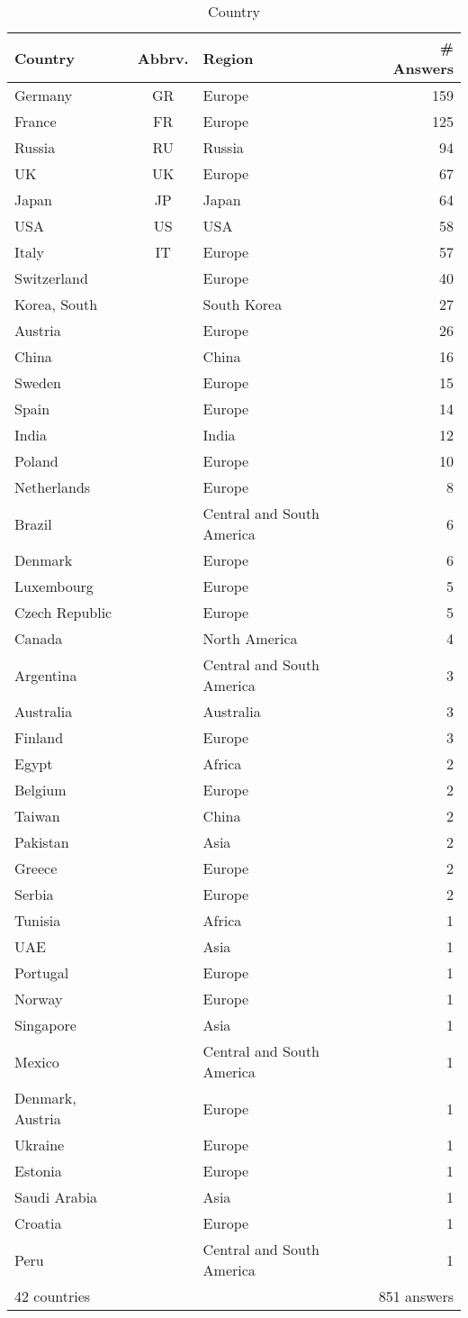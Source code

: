 \begin{table}[htb]%
\begin{center}%
\caption{Country}\label{tab:countries}%
\begin{tabular}{l|c|l|r}%
\hline%
Country & Abbrv. & Region & \# Answers \\%
\hline%
Germany&GR&Europe&159\\%
France&FR&Europe&125\\%
Russia&RU&Russia&94\\%
UK&UK&Europe&67\\%
Japan&JP&Japan&64\\%
USA&US&USA&58\\%
Italy&IT&Europe&57\\%
\hline%
Switzerland&&Europe&40\\%
Korea, South&&South Korea&27\\%
Austria&&Europe&26\\%
China&&China&16\\%
Sweden&&Europe&15\\%
Spain&&Europe&14\\%
India&&India&12\\%
Poland&&Europe&10\\%
Netherlands&&Europe&8\\%
Brazil&&Central and South America&6\\%
Denmark&&Europe&6\\%
Luxembourg&&Europe&5\\%
Czech Republic&&Europe&5\\%
Canada&&North America&4\\%
Argentina&&Central and South America&3\\%
Australia&&Australia&3\\%
Finland&&Europe&3\\%
Egypt&&Africa&2\\%
Belgium&&Europe&2\\%
Taiwan&&China&2\\%
Pakistan&&Asia&2\\%
Greece&&Europe&2\\%
Serbia&&Europe&2\\%
Tunisia&&Africa&1\\%
UAE&&Asia&1\\%
Portugal&&Europe&1\\%
Norway&&Europe&1\\%
Singapore&&Asia&1\\%
Mexico&&Central and South America&1\\%
Denmark, Austria&&Europe&1\\%
Ukraine&&Europe&1\\%
Estonia&&Europe&1\\%
Saudi Arabia&&Asia&1\\%
Croatia&&Europe&1\\%
Peru&&Central and South America&1\\%
\hline%
42 countries & & & 851 answers \\%
\hline%
\end{tabular}%
\end{center}%
\end{table}%
